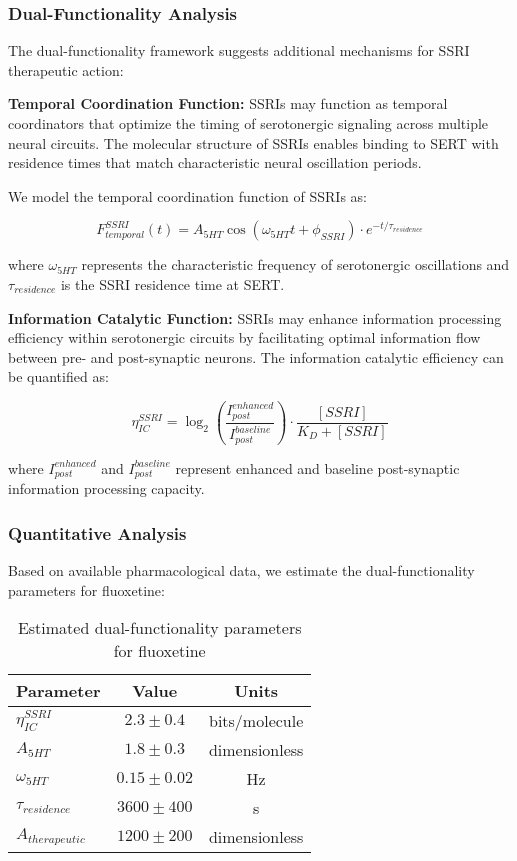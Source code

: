 \documentclass[12pt,a4paper]{article}
\begin{document}
\subsubsection{Dual-Functionality Analysis}

The dual-functionality framework suggests additional mechanisms for SSRI therapeutic action:

\textbf{Temporal Coordination Function:}
SSRIs may function as temporal coordinators that optimize the timing of serotonergic signaling across multiple neural circuits. The molecular structure of SSRIs enables binding to SERT with residence times that match characteristic neural oscillation periods.

We model the temporal coordination function of SSRIs as:

$$F_{temporal}^{SSRI}(t) = A_{5HT} \cos(\omega_{5HT} t + \phi_{SSRI}) \cdot e^{-t/\tau_{residence}}$$

where $\omega_{5HT}$ represents the characteristic frequency of serotonergic oscillations and $\tau_{residence}$ is the SSRI residence time at SERT.

\textbf{Information Catalytic Function:}
SSRIs may enhance information processing efficiency within serotonergic circuits by facilitating optimal information flow between pre- and post-synaptic neurons. The information catalytic efficiency can be quantified as:

$$\eta_{IC}^{SSRI} = \log_2\left(\frac{I_{post}^{enhanced}}{I_{post}^{baseline}}\right) \cdot \frac{[SSRI]}{K_D + [SSRI]}$$

where $I_{post}^{enhanced}$ and $I_{post}^{baseline}$ represent enhanced and baseline post-synaptic information processing capacity.

\subsubsection{Quantitative Analysis}

Based on available pharmacological data, we estimate the dual-functionality parameters for fluoxetine:

\begin{table}[htbp]
\centering
\caption{Estimated dual-functionality parameters for fluoxetine}
\begin{tabular}{lcc}
\toprule
Parameter & Value & Units \\
\midrule
$\eta_{IC}^{SSRI}$ & $2.3 \pm 0.4$ & bits/molecule \\
$A_{5HT}$ & $1.8 \pm 0.3$ & dimensionless \\
$\omega_{5HT}$ & $0.15 \pm 0.02$ & Hz \\
$\tau_{residence}$ & $3600 \pm 400$ & s \\
$A_{therapeutic}$ & $1200 \pm 200$ & dimensionless \\
\bottomrule
\end{tabular}
\label{tab:fluoxetine_parameters}
\end{table}
\end{document}
